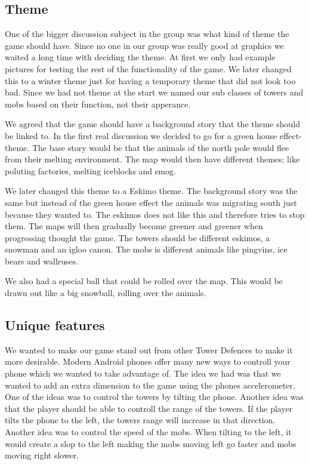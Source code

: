 \subsection{Theme}

One of the bigger discussion subject in the group was what kind of theme the game should have.   Since no one in our group was really good at graphics we waited a long time with deciding the theme. At first we only had example pictures for testing the rest of the functionality of the game. We later changed this to a winter theme just for having a temporary theme that did not look too bad. Since we had not theme at the start we named our sub classes of towers and mobs based on their function, not their apperance.

We agreed that the game should have a background story that the theme should be linked to. In the first real discussion we decided to go for a green house effect-theme. The base story would be that the animals of the north pole would flee from their melting environment. The map would then have different themes; like poluting factories, melting iceblocks and smog.

We later changed this theme to a Eskimo theme. The background story was the same but instead of the green house effect the animals was migrating south just because they wanted to. The eskimos does not like this and therefore tries to stop them. The maps will then gradually become greener and greener when progressing thought the game. The towers should be different eskimos, a snowman and an igloo canon. The mobs is different animals like pingvins, ice bears and wallruses. 

We also had a special ball that could be rolled over the map. This would be drawn out like a big snowball, rolling over the animals.
\subsection{Unique features}

We wanted to make our game stand out from other Tower Defences to make it more desirable. Modern Android phones offer many new ways to controll your phone which we wanted to take advantage of. The idea we had was that we wanted to add an extra dimension to the game using the phones accelerometer. One of the ideas was to control the towers by tilting the phone. Another idea was that the player should be able to controll the range of the towers. If the player tilts the phone to the left, the towers range will increase in that direction. Another idea was to control the speed of the mobs. When tilting to the left, it would create a slop to the left making the mobs moving left go faster and mobs moving right slower. 

